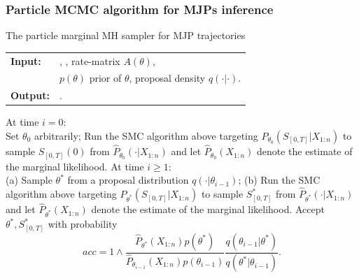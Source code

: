 \subsubsection{Particle MCMC algorithm for MJPs inference}

\begin{algorithm}[H]
  \caption{The particle marginal MH sampler for MJP trajectories}
   \label{alg:SMC}
  \begin{tabular}{l l}
   \textbf{Input:  } & \text{Prior $\pi_0$, observations $X$}, 
                       \text{Number of particles $N$}, rate-matrix $A(\theta)$,\\
                     & $p(\theta)$ prior of $\theta$, proposal density $q(\cdot|\cdot)$. \\
   \textbf{Output:  }& \text{New MJP trajectory $S' (t) = (s'_0, S', T')$}.\\
   \hline
   \end{tabular}
   \begin{algorithmic}[1]
\State At time $i = 0$:\\
\noindent Set $\theta_0$ arbitrarily;
\noindent Run the SMC algorithm above targeting $P_{\theta_0}(S_{[0, T]} | X_{1:n})$ to sample $S_{[0, T]}(0)$ from $\hat{P}_{\theta_0}(\cdot | X_{1:n})$ and let $\hat{P}_{\theta_0}(X_{1:n})$ denote the estimate of the marginal likelihood.
\State At time $i \geq 1:$\\
\noindent \noindent (a) Sample $\theta^*$ from a proposal distribution $q(\cdot | \theta_{i - 1})$;
\noindent \noindent (b) Run the SMC algorithm above targeting $P_{\theta^*}(S_{[0, T]} | X_{1:n})$ to sample $S_{[0, T]}^*$ from $\hat{P}_{\theta^*}(\cdot | X_{1:n})$ and let $\hat{P}_{\theta^*}(X_{1:n})$ denote the estimate of the marginal likelihood.
\noindent Accept $\theta^*, S_{[0, T]}^*$ with probability $$ acc = 1 \wedge \frac{\hat{P}_{\theta^*}(X_{1:n}) p(\theta^*)}{\hat{P}_{\theta_{i - 1}}(X_{1:n}) p(\theta_{i  - 1})} \frac{q(\theta_{i - 1} | \theta^*)}{q(\theta^* | \theta_{i - 1})}.$$

\end{algorithmic}
\end{algorithm}


